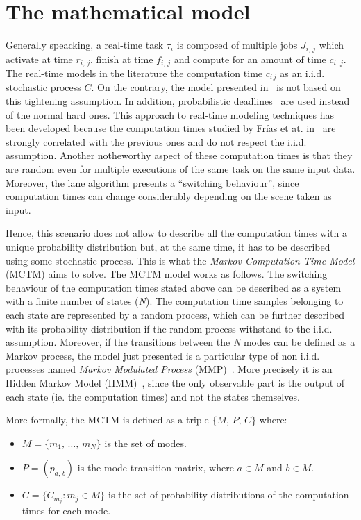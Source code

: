 \section{The mathematical model}\label{sec:math_model}
Generally speacking, a real-time task \(\tau_{i}\) is composed of multiple jobs
\(J_{i,\,j}\) which activate at time \(r_{i,\,j}\), finish at time \(f_{i,\,j}\)
and compute for an amount of time \(c_{i,\,j}\). The real-time models in the
literature the computation time \(c_{i\,j}\) as an i.i.d. stochastic process \(C\).
On the contrary, the model presented in~\cite{frias2017probabilistic} is not
based on this tightening assumption. In addition, probabilistic
deadlines~\cite{abeni1999qos} are used instead of the normal hard ones.
This approach to real-time modeling techniques has been developed because the
computation times studied by Fr\'{i}as et at. in~\cite{frias2017probabilistic}
are strongly correlated with the previous ones and do not respect the i.i.d.
assumption. Another notheworthy aspect of these computation times is that they
are random even for multiple executions of the same task on the same input data.
Moreover, the lane algorithm presents a ``switching behaviour'', since computation
times can change considerably depending on the scene taken as input.

Hence, this scenario does not allow to describe all the computation times with
a unique probability distribution but, at the same time, it has to be described
using some stochastic process. This is what the \emph{Markov Computation Time Model}
(MCTM) aims to solve.
The MCTM model works as follows. The switching behaviour of the computation
times stated above can be described as a system with a finite number of states
(\emph{N}). The computation time samples belonging to each state are represented
by a random process, which can be further described with its probability
distribution if the random process withstand to the i.i.d. assumption.
Moreover, if the transitions between the \emph{N} modes can be defined as a Markov
process, the model just presented is a particular type of non i.i.d. processes
named \emph{Markov Modulated Process} (MMP)~\cite{fischer1993markov}.
More precisely it is an Hidden Markov Model (HMM)~\cite{eddy1996hidden}, since
the only observable part is the output of each state (ie. the computation times)
and not the states themselves.

More formally, the MCTM is defined as a triple \(\{M,\,P,\,C\}\) where:
\begin{itemize}
    \item \( M = \{ m_1,\,\dots,\,m_N \} \) is the set of modes.
    \item \( P = (p_{a,\,b}) \) is the mode transition matrix, where
        \(a \in M\) and \(b \in M\).
    \item \( C = \{ C_{m_j} : m_j \in M \} \) is the set of probability
        distributions of the computation times for each mode.
\end{itemize}
